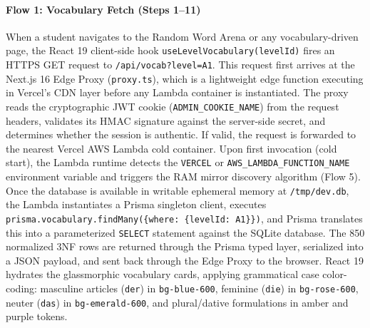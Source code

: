 \documentclass[12pt,a4paper]{article}
\begin{document}
\paragraph{Flow 1: Vocabulary Fetch (Steps 1--11)}
When a student navigates to the Random Word Arena or any vocabulary-driven page, the React 19 client-side hook \texttt{useLevelVocabulary(levelId)} fires an HTTPS GET request to \texttt{/api/vocab?level=A1}. This request first arrives at the Next.js 16 Edge Proxy (\texttt{proxy.ts}), which is a lightweight edge function executing in Vercel's CDN layer before any Lambda container is instantiated. The proxy reads the cryptographic JWT cookie (\texttt{ADMIN\_COOKIE\_NAME}) from the request headers, validates its HMAC signature against the server-side secret, and determines whether the session is authentic. If valid, the request is forwarded to the nearest Vercel AWS Lambda cold container. Upon first invocation (cold start), the Lambda runtime detects the \texttt{VERCEL} or \texttt{AWS\_LAMBDA\_FUNCTION\_NAME} environment variable and triggers the RAM mirror discovery algorithm (Flow 5). Once the database is available in writable ephemeral memory at \texttt{/tmp/dev.db}, the Lambda instantiates a Prisma singleton client, executes \texttt{prisma.vocabulary.findMany(\{where: \{levelId: \textquotesingle A1\textquotesingle\}\})}, and Prisma translates this into a parameterized \texttt{SELECT} statement against the SQLite database. The 850 normalized 3NF rows are returned through the Prisma typed layer, serialized into a JSON payload, and sent back through the Edge Proxy to the browser. React 19 hydrates the glassmorphic vocabulary cards, applying grammatical case color-coding: masculine articles (\texttt{der}) in \texttt{bg-blue-600}, feminine (\texttt{die}) in \texttt{bg-rose-600}, neuter (\texttt{das}) in \texttt{bg-emerald-600}, and plural/dative formulations in amber and purple tokens.
\end{document}
